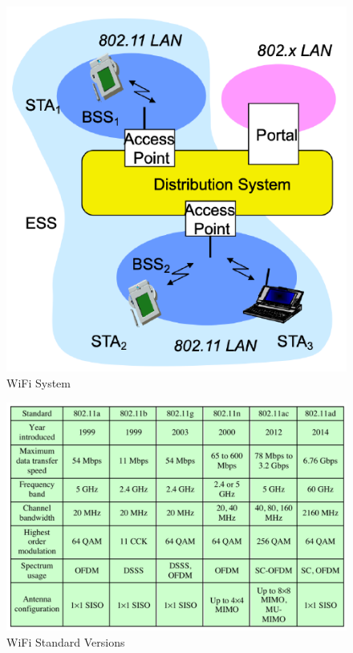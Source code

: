 \begin{figure}[h]
	\centering
	\includegraphics[scale=0.5]{images/9-wifi-terminology.png}
	\caption{WiFi System}
	\label{fig:wifi-terminology}
\end{figure}

\begin{figure}
	\centering
	\includegraphics[scale=0.4]{images/9-wifi-versions.png}
	\caption{WiFi Standard Versions}
	\label{fig:wifi-versions}
\end{figure}

